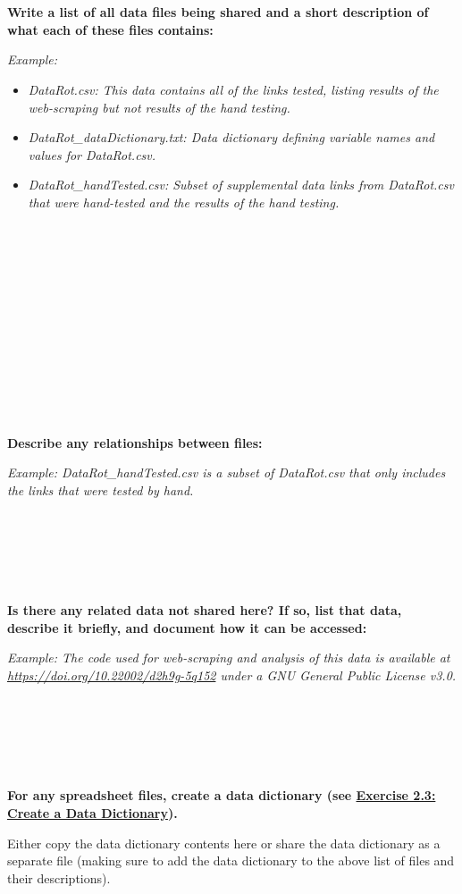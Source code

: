 \documentclass[
]{book}
\providecommand{\tightlist}{%
  \setlength{\itemsep}{0pt}\setlength{\parskip}{0pt}}
\begin{document}
~

~

\textbf{Write a list of all data files being shared and a short description of what each of these files contains:}

\emph{Example:}

\begin{itemize}
\tightlist
\item
  \emph{DataRot.csv: This data contains all of the links tested, listing results of the web-scraping but not results of the hand testing.}
\item
  \emph{DataRot\_dataDictionary.txt: Data dictionary defining variable names and values for DataRot.csv.}
\item
  \emph{DataRot\_handTested.csv: Subset of supplemental data links from DataRot.csv that were hand-tested and the results of the hand testing.}
\end{itemize}

~

~

~

~

~

~

~

\textbf{Describe any relationships between files:}

\emph{Example: DataRot\_handTested.csv is a subset of DataRot.csv that only includes the links that were tested by hand.}

~

~

~

\textbf{Is there any related data not shared here? If so, list that data, describe it briefly, and document how it can be accessed:}

\emph{Example: The code used for web-scraping and analysis of this data is available at \url{https://doi.org/10.22002/d2h9g-5q152} under a GNU General Public License v3.0.}

~

~

~

\textbf{For any spreadsheet files, create a data dictionary (see \protect\hyperlink{data-dictionary}{Exercise 2.3: Create a Data Dictionary}).}

Either copy the data dictionary contents here or share the data dictionary as a separate file (making sure to add the data dictionary to the above list of files and their descriptions).
\end{document}
